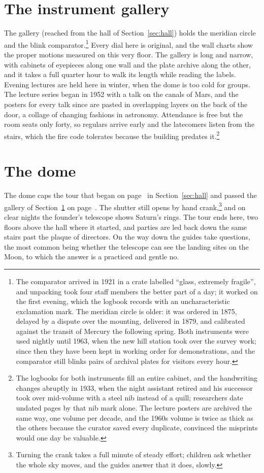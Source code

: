 \documentclass[11pt]{article}
\begin{document}
\section{The instrument gallery}
\label{sec:gallery}
The gallery (reached from the hall of Section~\ref{sec:hall}) holds the meridian circle and the blink comparator.\footnote{The comparator arrived in 1921 in a crate labelled ``glass, extremely fragile'', and unpacking took four staff members the better part of a day; it worked on the first evening, which the logbook records with an uncharacteristic exclamation mark. The meridian circle is older: it was ordered in 1875, delayed by a dispute over the mounting, delivered in 1879, and calibrated against the transit of Mercury the following spring. Both instruments were used nightly until 1963, when the new hill station took over the survey work; since then they have been kept in working order for demonstrations, and the comparator still blinks pairs of archival plates for visitors every hour.} Every dial here is original, and the wall charts show the proper motions measured on this very floor. The gallery is long and narrow, with cabinets of eyepieces along one wall and the plate archive along the other, and it takes a full quarter hour to walk its length while reading the labels. Evening lectures are held here in winter, when the dome is too cold for groups. The lecture series began in 1952 with a talk on the canals of Mars, and the posters for every talk since are pasted in overlapping layers on the back of the door, a collage of changing fashions in astronomy. Attendance is free but the room seats only forty, so regulars arrive early and the latecomers listen from the stairs, which the fire code tolerates because the building predates it.\footnote{The logbooks for both instruments fill an entire cabinet, and the handwriting changes abruptly in 1933, when the night assistant retired and his successor took over mid-volume with a steel nib instead of a quill; researchers date undated pages by that nib mark alone. The lecture posters are archived the same way, one volume per decade, and the 1960s volume is twice as thick as the others because the curator saved every duplicate, convinced the misprints would one day be valuable.}
\section{The dome}
\label{sec:dome}
The dome caps the tour that began on page~\pageref{sec:hall} in Section~\ref{sec:hall} and passed the gallery of Section~\ref{sec:gallery} on page~\pageref{sec:gallery}. The shutter still opens by hand crank,\footnote{Turning the crank takes a full minute of steady effort; children ask whether the whole sky moves, and the guides answer that it does, slowly.} and on clear nights the founder's telescope shows Saturn's rings. The tour ends here, two floors above the hall where it started, and parties are led back down the same stairs past the plaque of directors. On the way down the guides take questions, the most common being whether the telescope can see the landing sites on the Moon, to which the answer is a practiced and gentle no.
\end{document}
